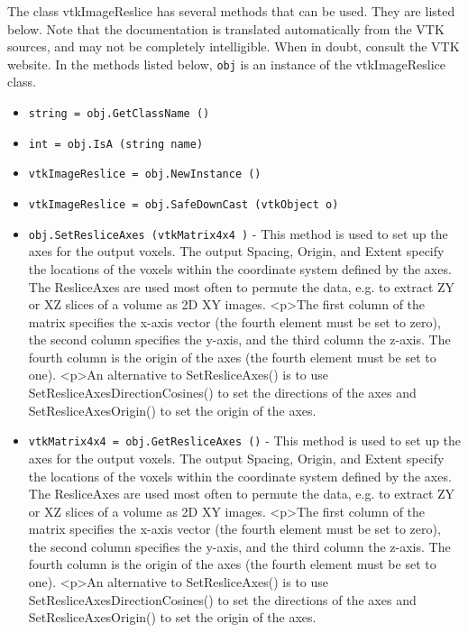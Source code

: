 The class vtkImageReslice has several methods that can be used.
  They are listed below.
Note that the documentation is translated automatically from the VTK sources,
and may not be completely intelligible.  When in doubt, consult the VTK website.
In the methods listed below, \verb|obj| is an instance of the vtkImageReslice class.
\begin{itemize}
\item  \verb|string = obj.GetClassName ()|

\item  \verb|int = obj.IsA (string name)|

\item  \verb|vtkImageReslice = obj.NewInstance ()|

\item  \verb|vtkImageReslice = obj.SafeDownCast (vtkObject o)|

\item  \verb|obj.SetResliceAxes (vtkMatrix4x4 )| -  This method is used to set up the axes for the output voxels.
 The output Spacing, Origin, and Extent specify the locations
 of the voxels within the coordinate system defined by the axes.
 The ResliceAxes are used most often to permute the data, e.g.
 to extract ZY or XZ slices of a volume as 2D XY images.
 <p>The first column of the matrix specifies the x-axis 
 vector (the fourth element must be set to zero), the second
 column specifies the y-axis, and the third column the
 z-axis.  The fourth column is the origin of the
 axes (the fourth element must be set to one).  
 <p>An alternative to SetResliceAxes() is to use 
 SetResliceAxesDirectionCosines() to set the directions of the
 axes and SetResliceAxesOrigin() to set the origin of the axes.

\item  \verb|vtkMatrix4x4 = obj.GetResliceAxes ()| -  This method is used to set up the axes for the output voxels.
 The output Spacing, Origin, and Extent specify the locations
 of the voxels within the coordinate system defined by the axes.
 The ResliceAxes are used most often to permute the data, e.g.
 to extract ZY or XZ slices of a volume as 2D XY images.
 <p>The first column of the matrix specifies the x-axis 
 vector (the fourth element must be set to zero), the second
 column specifies the y-axis, and the third column the
 z-axis.  The fourth column is the origin of the
 axes (the fourth element must be set to one).  
 <p>An alternative to SetResliceAxes() is to use 
 SetResliceAxesDirectionCosines() to set the directions of the
 axes and SetResliceAxesOrigin() to set the origin of the axes.


\end{itemize}
